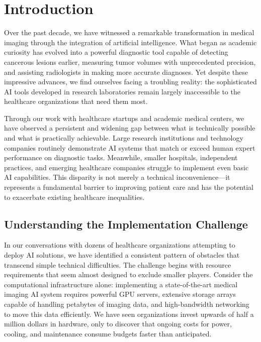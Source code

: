 \documentclass[12pt,a4paper]{article}
\begin{document}
\newpage
\tableofcontents
\newpage

\section{Introduction}

Over the past decade, we have witnessed a remarkable transformation in medical imaging through the integration of artificial intelligence. What began as academic curiosity has evolved into a powerful diagnostic tool capable of detecting cancerous lesions earlier, measuring tumor volumes with unprecedented precision, and assisting radiologists in making more accurate diagnoses. Yet despite these impressive advances, we find ourselves facing a troubling reality: the sophisticated AI tools developed in research laboratories remain largely inaccessible to the healthcare organizations that need them most.

Through our work with healthcare startups and academic medical centers, we have observed a persistent and widening gap between what is technically possible and what is practically achievable. Large research institutions and technology companies routinely demonstrate AI systems that match or exceed human expert performance on diagnostic tasks. Meanwhile, smaller hospitals, independent practices, and emerging healthcare companies struggle to implement even basic AI capabilities. This disparity is not merely a technical inconvenience—it represents a fundamental barrier to improving patient care and has the potential to exacerbate existing healthcare inequalities.

\subsection{Understanding the Implementation Challenge}

In our conversations with dozens of healthcare organizations attempting to deploy AI solutions, we have identified a consistent pattern of obstacles that transcend simple technical difficulties. The challenge begins with resource requirements that seem almost designed to exclude smaller players. Consider the computational infrastructure alone: implementing a state-of-the-art medical imaging AI system requires powerful GPU servers, extensive storage arrays capable of handling petabytes of imaging data, and high-bandwidth networking to move this data efficiently. We have seen organizations invest upwards of half a million dollars in hardware, only to discover that ongoing costs for power, cooling, and maintenance consume budgets faster than anticipated. 
\end{document}
